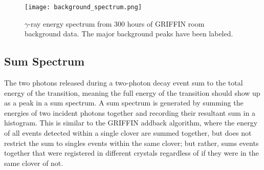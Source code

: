 \documentclass[cnatzke_thesis_proposal.tex]{subfiles}
\begin{document}
\begin{figure}[htbp]
  \centering
  \texttt{[image: background\_spectrum.png]}
  \caption{$\gamma$-ray energy spectrum from 300 hours of GRIFFIN room background data. The major background peaks have been labeled.}
  \label{fig:background_spectrum}
\end{figure}

\subsection{Sum Spectrum}

The two photons released during a two-photon decay event sum to the total energy of the transition, meaning the full energy of the transition should show up as a peak in a sum spectrum. 
A sum spectrum is generated by summing the energies of two incident photons together and recording their resultant sum in a histogram.
This is similar to the GRIFFIN addback algorithm, where the energy of all events detected within a single clover are summed together, but does not restrict the sum to singles events within the same clover; but rather, sums events together that were registered in different crystals regardless of if they were in the same clover of not. 



\end{document}
